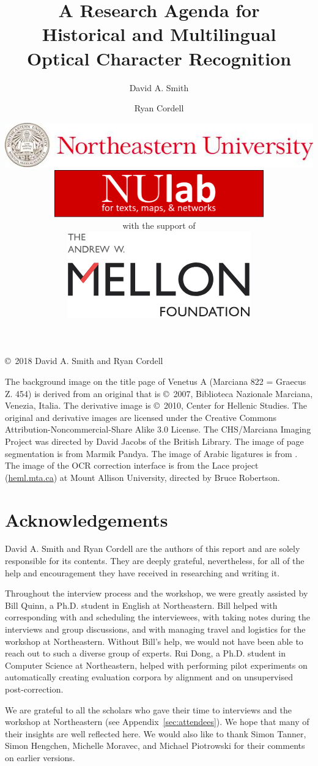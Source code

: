 \documentclass[twoside,11pt]{report}
\title{\Huge A Research Agenda for \\ Historical and Multilingual \\ Optical Character Recognition}
\author{\huge David A. Smith \and \huge Ryan Cordell}
\date{\centering \vspace{0.2in} \includegraphics[width=5.5in]{northeastern.png} \vspace{0.5in} \\
  \includegraphics{nulab.png} \\
  \vspace{0.2in} \centering \huge with the support of \\ \vspace{0.1in}
  \includegraphics{mellon.png}}
\newcommand\BackgroundPic{%
\put(0,0){%
\parbox[b][\paperheight]{\paperwidth}{%
\vfill
\centering
\texttt{[image: background8.png]}%
\vfill
}}}
\begin{document}
\AddToShipoutPicture*{\BackgroundPic}

\maketitle

\noindent \copyright\ 2018 David A. Smith and Ryan Cordell

\vspace{2em}

\noindent The background image on the title page of Venetus A (Marciana 822 = Graecus Z. 454) is derived from an original that is \copyright\ 2007, Biblioteca Nazionale Marciana, Venezia, Italia. The derivative image is \copyright\ 2010, Center for Hellenic Studies. The original and derivative images are licensed under the Creative Commons Attribution-Noncommercial-Share Alike 3.0 License. The CHS/Marciana Imaging Project was directed by David Jacobs of the British Library.  The image of page segmentation is from Marmik Pandya.  The image of Arabic ligatures is from \cite{kiessling17:_impor_new_devel_arabog_optic}.  The image of the OCR correction interface is from the Lace project (\url{heml.mta.ca}) at Mount Allison University, directed by Bruce Robertson.

\tableofcontents

\chapter{Acknowledgements}

David A. Smith and Ryan Cordell are the authors of this report and are solely responsible for its contents.  They are deeply grateful, nevertheless, for all of the help and encouragement they have received in researching and writing it.

Throughout the interview process and the workshop, we were greatly assisted by Bill Quinn, a Ph.D. student in English at Northeastern. Bill helped with corresponding with and scheduling the interviewees, with taking notes during the interviews and group discussions, and with managing travel and logistics for the workshop at Northeastern. Without Bill's help, we would not have been able to reach out to such a diverse group of experts. Rui Dong, a Ph.D. student in Computer Science at Northeastern, helped with performing pilot experiments on automatically creating evaluation corpora by alignment and on unsupervised post-correction.

We are grateful to all the scholars who gave their time to interviews and the workshop at Northeastern (see Appendix~\ref{sec:attendees}).  We hope that many of their insights are well reflected here.  We would also like to thank Simon Tanner, Simon Hengchen, Michelle Moravec, and Michael Piotrowski for their comments on earlier versions.
\end{document}
